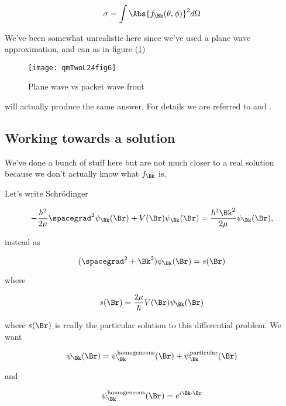 \begin{equation}\label{eqn:qmTwoL24:270}
\sigma = \int \Abs{f_\Bk(\theta, \phi)}^2 d\Omega
\end{equation}

We've been somewhat unrealistic here since we've used a plane wave approximation, and can as in figure (\ref{fig:qmTwoL24:qmTwoL24fig6})

\begin{figure}[htp]
   \centering
   \texttt{[image: qmTwoL24fig6]}
   \caption{Plane wave vs packet wave front}\label{fig:qmTwoL24:qmTwoL24fig6}
\end{figure}

will actually produce the same answer.  For details we are referred to \cite{messiah1999quantum} and \cite{taylor1972scattering}.

\subsection{Working towards a solution}

We've done a bunch of stuff here but are not much closer to a real solution because we don't actually know what $f_\Bk$ is.

Let's write Schr\"{o}dinger

\begin{equation}\label{eqn:qmTwoL24:290}
-\frac{\hbar^2}{2\mu} \spacegrad^2
\psi_\Bk(\Br)
+ V(\Br)
\psi_\Bk(\Br)
=
\frac{\hbar^2 \Bk^2}{2 \mu}
\psi_\Bk(\Br),
\end{equation}

instead as

\begin{equation}\label{eqn:qmTwoL24:310}
(\spacegrad^2 + \Bk^2)
\psi_\Bk(\Br)
= s(\Br)
\end{equation}

where

\begin{equation}\label{eqn:qmTwoL24:330}
s(\Br) = \frac{2\mu}{\hbar} V(\Br) \psi_\Bk(\Br)
\end{equation}

where $s(\Br)$ is really the particular solution to this differential problem.   We want

\begin{equation}\label{eqn:qmTwoL24:350}
\psi_\Bk(\Br) =
\psi_\Bk^{\text{homogeneous}}(\Br)
+ \psi_\Bk^{\text{particular}}(\Br)
\end{equation}

and

\begin{equation}\label{eqn:qmTwoL24:370}
\psi_\Bk^{\text{homogeneous}}(\Br) = e^{i \Bk \cdot \Br}
\end{equation}

\EndArticle
